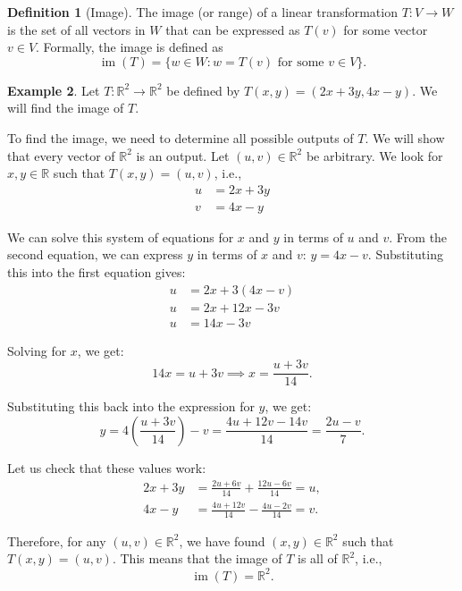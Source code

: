 \documentclass[11pt]{article}
\theoremstyle{definition}
\newtheorem{definition}{Definition}[section]
\newtheorem{example}[definition]{Example}
\theoremstyle{plain}
\theoremstyle{remark}
\DeclareMathOperator{\im}{im}
\begin{document}
\begin{definition}[Image]
    The image (or range) of a linear transformation $T: V \to W$ is the set of all vectors in $W$ that can be expressed as $T(v)$ for some vector $v \in V$. Formally, the image is defined as
    \[\im(T) = \{w \in W : w = T(v) \text{ for some } v \in V\}.\]
\end{definition}

\begin{example}\label{ex:im1}
    Let $T: \mathbb{R}^2 \to \mathbb{R}^2$ be defined by $T(x, y) = (2x + 3y, 4x - y)$. We will find the image of $T$.

    To find the image, we need to determine all possible outputs of $T$. We will show that every vector of $\mathbb{R}^2$ is an output. Let $(u, v) \in \mathbb{R}^2$ be arbitrary. We look for $x, y \in \mathbb{R}$ such that $T(x, y) = (u, v)$, i.e.,
    \begin{align*}
        u &= 2x + 3y \\
        v &= 4x - y
    \end{align*}

    We can solve this system of equations for $x$ and $y$ in terms of $u$ and $v$. From the second equation, we can express $y$ in terms of $x$ and $v$: $y = 4x - v$. Substituting this into the first equation gives:
    \begin{align*}
        u &= 2x + 3(4x - v) \\
        u &= 2x + 12x - 3v \\
        u &= 14x - 3v
    \end{align*}

    Solving for $x$, we get:
    \[14x = u + 3v \implies x = \frac{u + 3v}{14}.\]

    Substituting this back into the expression for $y$, we get:
    \[y = 4\left(\frac{u + 3v}{14}\right) - v = \frac{4u + 12v - 14v}{14} = \frac{2u - v}{7}.\]

    Let us check that these values work:
    \begin{align*}
        2x + 3y &= \frac{2u + 6v}{14} + \frac{12u - 6v}{14} = u, \\
        4x - y &= \frac{4u + 12v}{14} - \frac{4u - 2v}{14} = v.
    \end{align*}

    Therefore, for any $(u, v) \in \mathbb{R}^2$, we have found $(x, y) \in \mathbb{R}^2$ such that $T(x, y) = (u, v)$. This means that the image of $T$ is all of $\mathbb{R}^2$, i.e.,
    \[\im(T) = \mathbb{R}^2.\]
\end{example}
\end{document}
